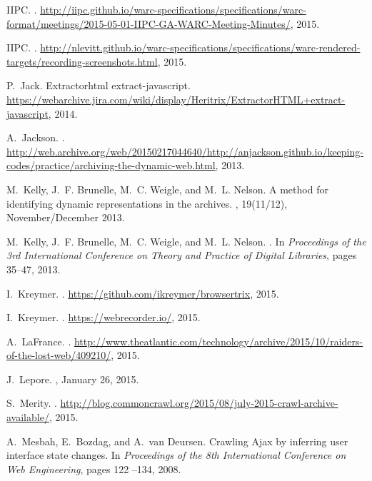 \documentclass{sig-alternate}
\begin{document}
\begin{thebibliography}{10}
{IIPC}.
.
\newblock
  \url{http://iipc.github.io/warc-specifications/specifications/warc-format/meetings/2015-05-01-IIPC-GA-WARC-Meeting-Minutes/},
  2015.

{IIPC}.
.
\newblock
  \url{http://nlevitt.github.io/warc-specifications/specifications/warc-rendered-targets/recording-screenshots.html},
  2015.

P.~Jack.
\newblock Extractorhtml extract-javascript.
\newblock
  \url{https://webarchive.jira.com/wiki/display/Heritrix/ExtractorHTML+extract-javascript},
  2014.

A.~Jackson.
.
\newblock
  \url{http://web.archive.org/web/20150217044640/http://anjackson.github.io/keeping-codes/practice/archiving-the-dynamic-web.html},
  2013.

M.~Kelly, J.~F. Brunelle, M.~C. Weigle, and M.~L. Nelson.
\newblock A method for identifying dynamic representations in the archives.
, 19(11/12), November/December 2013.

M.~Kelly, J.~F. Brunelle, M.~C. Weigle, and M.~L. Nelson.
.
\newblock In {\em {Proceedings of the 3rd International Conference on Theory
  and Practice of Digital Libraries}}, pages 35--47, 2013.

I.~Kreymer.
.
\newblock \url{https://github.com/ikreymer/browsertrix}, 2015.

I.~Kreymer.
.
\newblock \url{https://webrecorder.io/}, 2015.

A.~LaFrance.
.
\newblock
  \url{http://www.theatlantic.com/technology/archive/2015/10/raiders-of-the-lost-web/409210/},
  2015.

J.~Lepore.
, January 26, 2015.

S.~Merity.
.
\newblock
  \url{http://blog.commoncrawl.org/2015/08/july-2015-crawl-archive-available/},
  2015.

A.~Mesbah, E.~Bozdag, and A.~van Deursen.
\newblock Crawling {A}jax by inferring user interface state changes.
\newblock In {\em Proceedings of the 8th International Conference on Web
  Engineering}, pages 122 --134, 2008.


\end{thebibliography}
\end{document}
